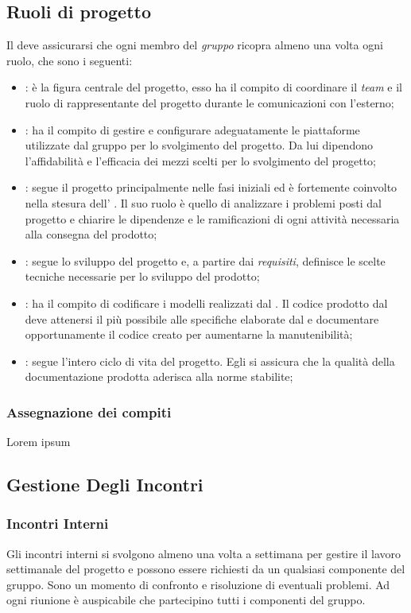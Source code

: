 
\subsection{Ruoli di progetto}
Il \RdP{} deve assicurarsi che ogni membro del \emph{gruppo} ricopra almeno una volta ogni ruolo, che sono i seguenti:
	\begin{itemize}
		\item \textbf{\RdP}: è la figura centrale del progetto, esso ha il compito di coordinare il \emph{team} e il ruolo di rappresentante del progetto durante le comunicazioni con l'esterno;
		\item \textbf{\Amm}: ha il compito di gestire e configurare adeguatamente le piattaforme utilizzate dal gruppo per lo svolgimento del progetto. Da lui dipendono l'affidabilità e l'efficacia dei mezzi scelti per lo svolgimento del progetto;
		\item \textbf{\Ana}: segue il progetto principalmente nelle fasi iniziali ed è fortemente coinvolto nella stesura dell' \AdR{}. Il suo ruolo è quello di analizzare i problemi posti dal progetto e chiarire le dipendenze e le ramificazioni di ogni attività necessaria alla consegna del prodotto;
		\item \textbf{\Prog}: segue lo sviluppo del progetto e, a partire dai \emph{requisiti}, definisce le scelte tecniche necessarie per lo sviluppo del prodotto;
		\item \textbf{\Progm}: ha il compito di codificare i modelli realizzati dal \Prog{}. Il codice prodotto dal \Progm{} deve attenersi il più possibile alle specifiche elaborate dal \Prog{} e documentare opportunamente il codice creato per aumentarne la manutenibilità;
		\item \textbf{\Ver}: segue l'intero ciclo di vita del progetto. Egli si assicura che la qualità della documentazione prodotta aderisca alla norme stabilite;
	\end{itemize}

	\subsubsection{Assegnazione dei compiti}
	Lorem ipsum %

\subsection{Gestione Degli Incontri}
	\subsubsection{Incontri Interni}
	Gli incontri interni si svolgono almeno una volta a settimana per gestire il lavoro settimanale del progetto e possono essere richiesti da un qualsiasi componente del gruppo. Sono un momento di confronto e risoluzione di eventuali problemi. Ad ogni riunione è auspicabile che partecipino tutti i componenti del gruppo.
